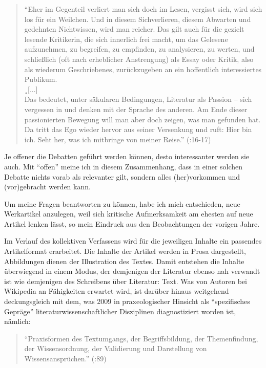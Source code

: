 \documentclass[fontsize=12pt]{scrartcl}
\begin{document}
\singlespacing
\begin{quote}
"`Eher im Gegenteil verliert man sich doch im Lesen, vergisst sich, wird sich los f\"ur ein Weilchen. Und in diesem Sichverlieren, diesem Abwarten und gedehnten Nichtwissen, wird man reicher. Das gilt auch f\"ur die gezielt lesende Kritikerin, die sich innerlich frei macht, um das Gelesene aufzunehmen, zu begreifen, zu empfinden, zu ana\-lysieren, zu werten, und schlie{\ss}lich (oft nach erheblicher Anstrengung) als Essay oder Kritik, also als wiederum Geschriebenes, zur\"uckzugeben an ein hof\-fent\-lich interessiertes Publikum.\\ 
¸[...]\\
Das bedeutet, unter s\"akularen Bedingungen, Li\-te\-ra\-tur als Passion -- sich vergessen in und denken mit der Sprache des anderen. Am Ende dieser passionierten Bewegung will man aber doch zeigen, was man gefunden hat. Da tritt das Ego wieder hervor aus seiner Versenkung und ruft: \mbox{Hier} bin ich. Seht her, was ich mitbringe von meiner Reise."' (\cite{Hartwig2012}:16-17)
\end{quote}
\onehalfspacing

Je offener die Debatten gef\"uhrt werden k\"onnen, desto interessanter werden sie auch. Mit "`offen"' meine ich in diesem Zusammenhang, dass in einer solchen Debatte nichts vorab als relevanter gilt, sondern alles (her)vorkommen und (vor)gebracht werden kann. 

Um meine Fragen beantworten zu k\"onnen, habe ich mich entschieden, neue Werkartikel anzulegen, weil sich kritische Aufmerksamkeit am ehesten auf neue Artikel lenken l\"asst, so mein Eindruck aus den Beobachtungen der vorigen Jahre. 

Im Verlauf des kollektiven Verfassens wird f\"ur die jeweiligen Inhalte ein passendes Artikelformat erarbeitet. Die Inhalte der Artikel werden in Prosa dargestellt, Abbildungen dienen der Illustration des Textes. Damit entstehen die Inhalte \"uberwiegend in einem Modus, der demjenigen der Li\-te\-ra\-tur ebenso nah verwandt ist wie demjenigen des Schrei\-bens \"uber Li\-te\-ra\-tur: Text. Was von Autoren\textsuperscript{\tiny *} bei Wi\-ki\-pe\-dia an F\"ahigkei\-ten erwartet wird, ist dar\"uber hinaus weitgehend deckungsgleich mit dem, was 2009 in praxeologischer Hinsicht als "`spezifisches Gepr\"age"' li\-te\-ra\-tur\-wis\-sen\-schaft\-li\-cher Dis\-ziplinen diagnostiziert worden ist, n\"amlich: 

\singlespacing
\begin{quote}
"`Praxisformen des Textumgangs, der Begriffsbildung, der Themen\-fin\-dung, der Wissensordnung, der Validierung und Darstellung von Wis\-sens\-anspr\"uchen."' (\cite{MartusSpoerhase2009}:89)
\end{quote}
\onehalfspacing
\end{document}

